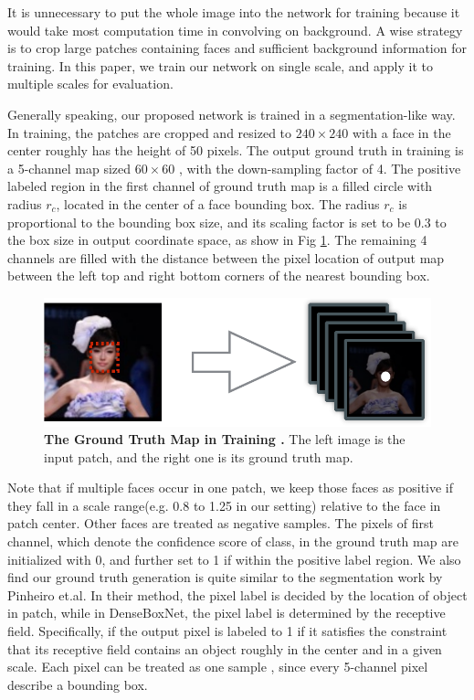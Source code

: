 It is unnecessary to put the whole image into the network for training because it would take most computation time in convolving on background. A wise strategy is to crop large patches containing faces and sufficient background information for training. In this paper, we train our network on single scale, and apply it to multiple scales for evaluation. 

Generally speaking, our proposed network is trained in a segmentation-like way.   In training, the patches are cropped and resized to $240 \times 240$ with a face in the center roughly has the height of 50 pixels. The output ground truth in training is a 5-channel map sized $60 \times 60 $ , with the down-sampling factor of 4. The positive labeled region in the first channel of ground truth map is a filled circle with radius $r_c$, located in the center of a face bounding box. The radius $r_c$ is proportional to the bounding box size, and its scaling factor is set to be 0.3 to the box size in output coordinate space, as show in Fig \ref{fig:fig_gt}. The remaining 4 channels are filled with the distance between the pixel location of output map between the left top and right bottom corners of the nearest bounding box.  


	\begin{figure}[!hbtp]
	\centering
	 \includegraphics[scale=0.55]{figures/figure2-crop.pdf}
	\caption{\textbf{The Ground Truth Map in Training .} The left image is the input patch, and the right one is its ground truth map. }
	\label{fig:fig_gt}
	\end{figure}

Note that if multiple faces occur in one patch, we keep those faces as positive if they fall in a scale range(e.g. 0.8 to 1.25 in our setting) relative to the face in patch center. Other faces are treated as negative samples. The pixels of first channel, which denote the confidence score of class, in the ground truth map are initialized with 0, and further set to 1 if within the positive label region.  We also find our ground truth generation is quite similar to the segmentation work\cite{pinheiro2015learning} by Pinheiro et.al.   In their method, the pixel label is decided by the location of object in patch, while in DenseBoxNet, the pixel label is determined by the receptive field. Specifically, if the output pixel is labeled to 1 if it satisfies the constraint that its receptive field contains an object roughly in the center and in a given scale. Each pixel can be treated as one sample , since every 5-channel pixel describe a bounding box.


